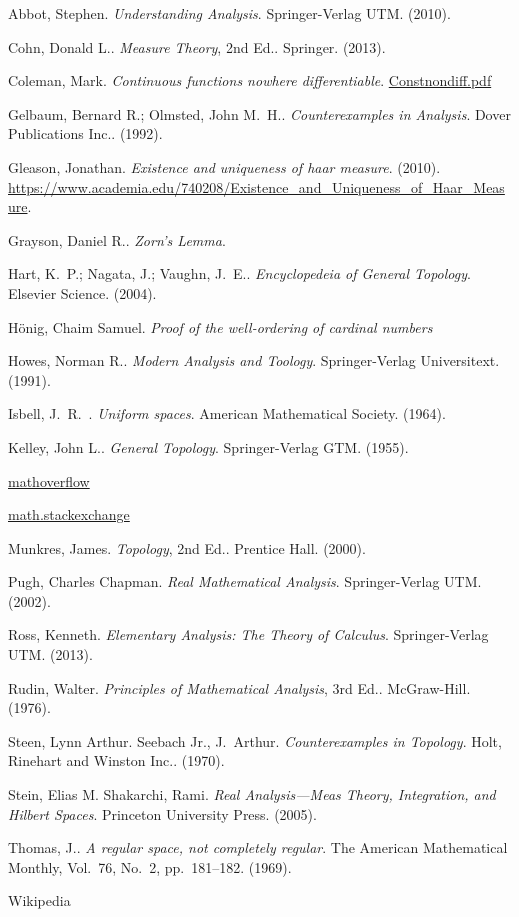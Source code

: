 \begin{thebibliography}{9}

Abbot, Stephen.  \textit{Understanding Analysis}.  Springer-Verlag UTM.  (2010).

Cohn, Donald L..  \textit{Measure Theory}, 2nd Ed..  Springer.  (2013).

Coleman, Mark.  \textit{Continuous functions nowhere differentiable}.  \href{http://www.maths.manchester.ac.uk/~mdc/MATH20101/notesPermanant/Contsnondiff.pdf}{Constnondiff.pdf}

Gelbaum, Bernard R.; Olmsted, John M.~H..  \textit{Counterexamples in Analysis}.  Dover Publications Inc..  (1992).

Gleason, Jonathan.  \textit{Existence and uniqueness of haar measure}.  (2010).  \url{https://www.academia.edu/740208/Existence_and_Uniqueness_of_Haar_Measure}.

Grayson, Daniel R..  \textit{Zorn's Lemma}.

Hart, K.~P.; Nagata, J.; Vaughn, J.~E..  \textit{Encyclopedeia of General Topology}.  Elsevier Science.  (2004).

H\"{o}nig, Chaim Samuel.  \textit{Proof of the well-ordering of cardinal numbers}

Howes, Norman R..  \textit{Modern Analysis and Toology}.  Springer-Verlag Universitext.  (1991).

Isbell, J.~R.~.  \textit{Uniform spaces}.  American Mathematical Society.  (1964).

Kelley, John L..  \textit{General Topology}.  Springer-Verlag GTM.  (1955).

\href{http://mathoverflow.net/}{mathoverflow}

\href{http://math.stackexchange.com/}{math.stackexchange}

Munkres, James.  \textit{Topology}, 2nd Ed..  Prentice Hall.  (2000).

Pugh, Charles Chapman.  \textit{Real Mathematical Analysis}.  Springer-Verlag UTM.  (2002).

Ross, Kenneth.  \textit{Elementary Analysis:  The Theory of Calculus}.  Springer-Verlag UTM.  (2013).

Rudin, Walter.  \textit{Principles of Mathematical Analysis}, 3rd Ed..  McGraw-Hill.  (1976).

Steen, Lynn Arthur.  Seebach Jr., J.~Arthur.  \textit{Counterexamples in Topology}.  Holt, Rinehart and Winston Inc..  (1970).

Stein, Elias M.  Shakarchi, Rami.  \textit{Real Analysis---Meas Theory, Integration, and Hilbert Spaces}.  Princeton University Press.  (2005).

Thomas, J..  \textit{A regular space, not completely regular}.  The American Mathematical Monthly, Vol.~76, No.~2, pp.~181--182.  (1969).

Wikipedia

\end{thebibliography}